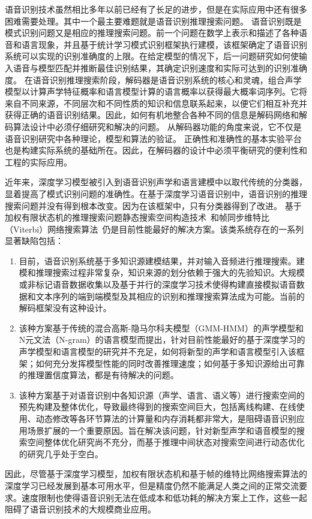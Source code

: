 语音识别技术虽然相比多年以前已经有了长足的进步，但是在实际应用中还有很多困难需要处理。其中一个最主要难题就是语音识别推理搜索问题。
%
语音识别既是模式识别问题又是相应的推理搜索问题。前一个问题在数学上表示和描述了各种语音和语言现象，并且基于统计学习模式识别框架执行建模，该框架确定了语音识别系统可以实现的识别准确度的上限。在给定模型的情况下，后一问题研究如何使输入语音与模型匹配并推断最佳识别结果，其确定识别速度和实际可达到的识别准确度。
在语音识别推理搜索阶段，解码器是语音识别系统的核心和灵魂，组合声学模型以计算声学特征概率和语言模型计算的语言概率以获得最大概率词序列。它将来自不同来源，不同层次和不同性质的知识和信息联系起来，以便它们相互补充并获得正确的语音识别结果。因此，如何有机地整合各种不同的信息是解码网络和解码算法设计中必须仔细研究和解决的问题。
从解码器功能的角度来说，它不仅是语音识别研究中各种理论，模型和算法的验证。
正确性和准确性的基本实验平台也是构建实际系统的基础所在。因此，在解码器的设计中必须平衡研究的便利性和工程的实际应用。


近年来，深度学习模型被引入到语音识别声学和语言建模中以取代传统的分类器，显着提高了模式识别问题的准确性。在基于深度学习语音识别中，语音识别的推理搜索问题并没有得到根本改变。因为在该框架中，只有分类器得到了改进。
基于加权有限状态机的推理搜索问题静态搜索空间构造技术~\cite{mohri2002weighted}和帧同步维特比（Viterbi）网络搜索算法~\cite{forney1973viterbi}仍是目前性能最好的解决方案。该类系统存在的一系列显著缺陷包括：
\begin{enumerate}
\item 目前，语音识别系统基于多知识源建模结果，并对输入音频进行推理搜索。建模和推理搜索过程非常复杂，知识来源的划分依赖于强大的先验知识。大规模或非标记语音数据收集以及基于并行的深度学习技术使得构建直接模拟语音数据和文本序列的端到端模型及其相应的识别和推理搜索算法成为可能。当前的解码框架没有这种设计。
\item 
该种方案基于传统的混合高斯-隐马尔科夫模型（GMM-HMM）的声学模型和N元文法（N-gram）的语言模型而提出，针对目前性能最好的基于深度学习的声学模型和语言模型的研究并不充足，如何将新型的声学和语言模型引入该框架；如何充分发挥模型性能的同时改善推理速度；如何基于多知识源给出可靠的推理置信度算法，都是有待解决的问题。
\item 
该种方案基于对语音识别中各知识源（声学、语言、语义等）进行搜索空间的预先构建及整体优化，导致最终得到的搜索空间巨大，包括离线构建、在线使用、动态修改等各环节算法的计算量和内存消耗都非常大，是阻碍语音识别应用场景扩展的一个重要原因。旨在解决该问题，针对新型声学和语音模型的搜索空间整体优化研究尚不充分，而基于推理中间状态对搜索空间进行动态优化的研究几乎处于空白。
\end{enumerate}
因此，尽管基于深度学习模型，加权有限状态机和基于帧的维特比网络搜索算法的深度学习已经发展到基本可用水平，但是精度仍然不能满足人类之间的正常交流要求。速度限制也使得语音识别无法在低成本和低功耗的解决方案上工作，这些一起阻碍了语音识别技术的大规模商业应用。

